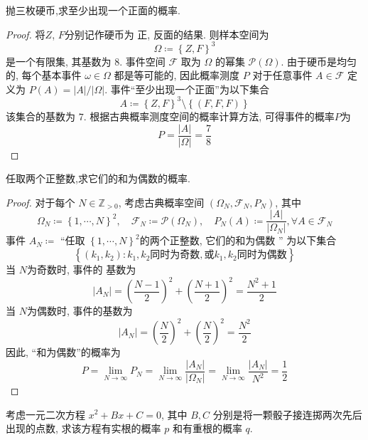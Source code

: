\documentclass[../main.tex]{subfiles}
\begin{document}
\begin{exercise}{}{}
抛三枚硬币,求至少出现一个正面的概率.
\end{exercise}
\begin{proof}
    将\(  Z  \), \(  F  \)分别记作硬币为 正, 反面的结果. 则样本空间为 \[
     \Omega \coloneqq \left\{ Z,F \right\}^{3}
    \]  是一个有限集, 其基数为 \(  8  \). 事件空间 $\mathcal{F}$ 取为 $\Omega$ 的幂集 $\mathcal{P}(\Omega)$. 由于硬币是均匀的, 每个基本事件 $\omega \in \Omega$ 都是等可能的, 因此概率测度 $P$ 对于任意事件 $A \in \mathcal{F}$ 定义为 $P(A) = |A|/|\Omega|$. 事件``至少出现一个正面''为以下集合 \[
A\coloneqq     \left\{ Z,F \right\}^{3}\setminus \left\{ \left( F,F,F \right)  \right\}
    \]该集合的基数为 \(  7  \). 根据古典概率测度空间的概率计算方法, 可得事件的概率\(  P  \)为 \[
    P= \frac{\left| A \right|  }{\left|  \Omega  \right| } = \frac{7 }{8 }  
    \] 
\end{proof}
\begin{exercise}{}{}
任取两个正整数,求它们的和为偶数的概率.
\end{exercise}
\begin{proof}
   对于每个 \(  N\in \mathbb{Z} _{> 0}  \), 考虑古典概率空间 \(  \left(  \Omega _{N},\mathcal{F}_{N},P_{N} \right)   \), 其中 \[
    \Omega _{N}\coloneqq  \left\{ 1,\cdots ,N \right\}^{2},\quad \mathcal{F}_{N}\coloneqq \mathcal{P}\left(  \Omega _{N} \right), \quad P_{N}\left( A \right)\coloneqq  \frac{\left| A \right|  }{\left|  \Omega _{N} \right|  }   ,\forall  A\in \mathcal{F}_{N}
   \]事件 \(  A_{N}\coloneqq   \)  ``任取 \(  \left\{ 1,\cdots ,N \right\}^{2}  \)的两个正整数, 它们的和为偶数 '' 为以下集合 \[
   \left\{ \left( k_1,k_2 \right): k_1,k_2\text{同时为奇数},\text{或}k_1,k_2\text{同时为偶数}\right\}
   \] 当 \(  N \)为奇数时, 事件的 基数为 \[
   \left| A_{N} \right|=  \left( \frac{N-1 }{2 }  \right)^{2} + \left( \frac{N+ 1 }{ 2}  \right)^{2} = \frac{N^{2}+ 1 }{2 } 
   \]当 \(  N  \)为偶数时, 事件的基数为 \[
  \left| A_{N} \right|=   \left( \frac{N }{2 }  \right)^{2}+ \left( \frac{N }{2 }  \right)^{2}= \frac{N^{2} }{2 } 
   \] 因此, ``和为偶数''的概率为 \[
   P= \lim_{N\to \infty}P_{N}=  \lim_{N\to \infty}\frac{\left| A_{N} \right|  }{\left|  \Omega _{N} \right|  } = \lim_{N\to \infty}\frac{\left| A_{N} \right|  }{N^{2} } = \frac{1 }{2 } 
   \]
\end{proof}
\begin{exercise}{}{}
考虑一元二次方程 $x^2+Bx+C=0$, 其中 $B,C$ 分别是将一颗骰子接连掷两次先后出现的点数, 求该方程有实根的概率 $p$ 和有重根的概率 $q$.
\end{exercise}
\end{document}

